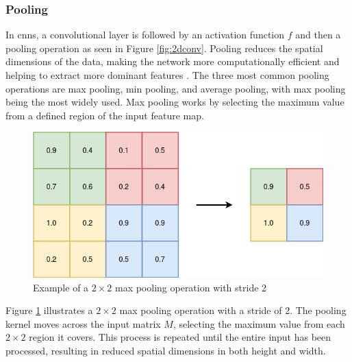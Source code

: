 \subsubsection{Pooling}
%
In \acrshort{cnn}s, a convolutional layer is followed by an activation function $f$ and then a pooling operation as seen in Figure \ref{fig:2dconv}. Pooling reduces the spatial dimensions of the data, making the network more computationally efficient and helping to extract more dominant features \cite{SUN201796}.
The three most common pooling operations are max pooling, min pooling, and average pooling, with max pooling being the most widely used. Max pooling works by selecting the maximum value from a defined region of the input feature map.
\begin{figure}[!h]
\centering
\includegraphics[scale=0.4]{figures/pooling.png}
\caption{Example of a $2 \times 2$ max pooling operation with stride 2}
\label{fig:maxpool}
\end{figure}
Figure \ref{fig:maxpool} illustrates a $2 \times 2$ max pooling operation with a stride of 2. The pooling kernel moves across the input matrix $M$, selecting the maximum value from each $2 \times 2$ region it covers. This process is repeated until the entire input has been processed, resulting in reduced spatial dimensions in both height and width. 